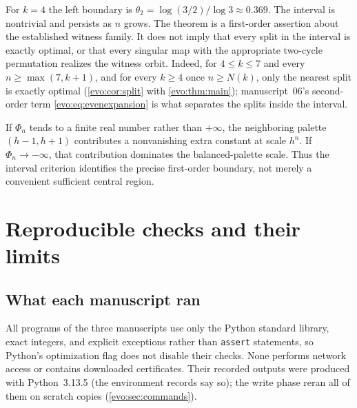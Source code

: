 \documentclass[11pt,a4paper]{article}
\numberwithin{equation}{section}
\theoremstyle{definition}
\theoremstyle{remark}
\begin{document}
For $k=4$ the left boundary is $\theta_2=\log(3/2)/\log3\approx0.369$. The
interval is nontrivial and persists as $n$ grows. The theorem is a first-order
assertion about the established witness family. It does not imply that every
split in the interval is exactly optimal, or that every singular map with the
appropriate two-cycle permutation realizes the witness orbit. Indeed, for
$4\le k\le7$ and every $n\ge\max(7,k+1)$, and for every $k\ge4$ once $n\ge
N(k)$, only the nearest split is exactly optimal (\cref{evo:cor:split} with
\cref{evo:thm:main}); manuscript~06's second-order term
\eqref{evo:eq:evenexpansion} is what separates the splits inside the
interval.

\begin{remark}\label{evo:da:rem:boundary}
If $\Phi_n$ tends to a finite real number rather than $+\infty$, the
neighboring palette $(h-1,h+1)$ contributes a nonvanishing extra constant at
scale $h^n$. If $\Phi_n\to-\infty$, that contribution dominates the
balanced-palette scale. Thus the interval criterion identifies the precise
first-order boundary, not merely a convenient sufficient central region.
\end{remark}

\section{Reproducible checks and their limits}\label{evo:sec:verification}

\subsection{What each manuscript ran}

All programs of the three manuscripts use only the Python standard library,
exact integers, and explicit exceptions rather than \texttt{assert}
statements, so Python's optimization flag does not disable their checks. None
performs network access or contains downloaded certificates. Their recorded
outputs were produced with Python~3.13.5 (the environment records say so); the
write phase reran all of them on scratch copies (\cref{evo:sec:commands}).
\end{document}
